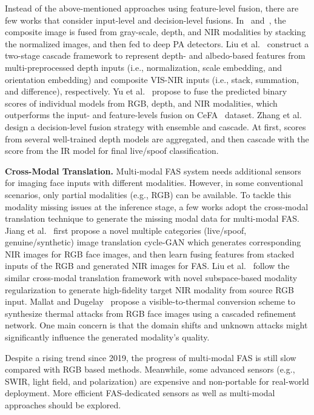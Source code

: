 \documentclass[10pt,journal,compsoc]{IEEEtran}
\begin{document}
Instead of the above-mentioned approaches using feature-level fusion, there are few works that consider input-level and decision-level fusions. In~\cite{nikisins2019domain}  and~\cite{george2020can}, the composite image is fused from gray-scale, depth, and NIR modalities by stacking the normalized images, and then fed to deep PA detectors. Liu et al.~\cite{liu2021data} construct a two-stage cascade framework to represent depth- and albedo-based features from multi-preprocessed depth inputs (i.e., normalization, scale embedding, and orientation embedding) and composite VIS-NIR inputs (i.e., stack, summation, and difference), respectively. Yu et al.~\cite{yu2020multi} propose to fuse the predicted binary scores of individual models from RGB, depth, and NIR modalities, which outperforms the input- and feature-levels fusion on CeFA~\cite{li2020casia} dataset. Zhang et al.~\cite{zhang2019feathernets} design a decision-level fusion strategy with ensemble and cascade. At first, scores from several well-trained depth models are aggregated, and then cascade with the score from the IR model for final live/spoof classification.     

\vspace{0.4em}

\noindent\textbf{Cross-Modal Translation.}\quad
Multi-modal FAS system needs additional sensors for imaging face inputs with different modalities. However, in some conventional scenarios, only partial modalities (e.g., RGB) can be available. To tackle this modality missing issues at the inference stage, a few works adopt the cross-modal translation technique to generate the missing modal data for multi-modal FAS. Jiang et al.~\cite{jiang2020face} first propose a novel multiple categories (live/spoof, genuine/synthetic) image translation cycle-GAN which generates corresponding NIR images for RGB face images, and then learn fusing features from stacked inputs of the RGB and generated NIR images for FAS. Liu et al.~\cite{liu2021face} follow the similar cross-modal translation framework with novel subspace-based modality regularization to generate high-fidelity target NIR modality from source RGB input. Mallat and Dugelay~\cite{mallatindirect2021} propose a visible-to-thermal conversion scheme to synthesize thermal attacks from RGB face images using a cascaded refinement network. One main concern is that the domain shifts and unknown attacks might significantly influence the generated modality's quality.


Despite a rising trend since 2019, the progress of multi-modal FAS is still slow compared with RGB based methods. Meanwhile, some advanced sensors (e.g., SWIR, light field, and polarization) are expensive and non-portable for real-world deployment. More efficient FAS-dedicated sensors as well as multi-modal approaches should be explored.  
\end{document}
